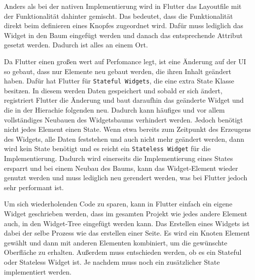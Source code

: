 
Anders als bei der nativen Implementierung wird in Flutter das Layoutfile mit der Funktionalität dahinter gemischt. Das bedeutet, dass die Funktionalität direkt beim definieren eines Knopfes zugeordnet wird. Dafür muss lediglich das Widget in den Baum eingefügt werden und danach das entsprechende Attribut gesetzt werden. Dadurch ist alles an einem Ort.

Da Flutter einen großen wert auf Perfomance legt, ist eine Änderung auf der \ac{UI} so gebaut, dass nur Elemente neu gebaut werden, die ihren Inhalt geändert haben. Dafür hat Flutter für \verb|Stateful Widgets|, die eine extra State Klasse besitzen. In diesem werden Daten gespeichert und sobald er sich ändert, registriert Flutter die Änderung und baut daraufhin das geänderte Widget und die in der Hierachie folgenden neu\cite{9623025}. Dadurch kann häufiges und vor allem vollständiges Neubauen des Widgetsbaums verhindert werden. Jedoch benötigt nicht jedes Element einen State. Wenn etwa bereits zum Zeitpunkt des Erzeugens des Widgets, alle Daten feststehen und auch nicht mehr geändert werden, dann wird kein State benötigt und es reicht ein \verb|Stateless Widget| für die Implementierung\cite[Kapitel~4]{Flutter_Recipes}. Dadurch wird einerseits die Implementierung eines States ersparrt und bei einem Neubau des Baums, kann das Widget-Element wieder genutzt werden und muss lediglich neu gerendert werden, was bei Flutter jedoch sehr performant ist.

Um sich wiederholenden Code zu sparen, kann in Flutter einfach ein eigene Widget geschrieben werden, dass im gesamten Projekt wie jedes andere Element auch, in den Widget-Tree eingefügt werden kann. Das Erstellen eines Widgets ist dabei der selbe Prozess wie das erstellen einer Seite. Es wird ein Knoten Element gewählt und dann mit anderen Elementen kombiniert, um die gewünschte Oberfläche zu erhalten. Außerdem muss entschieden werden, ob es ein Stateful oder Stateless Widget ist. Je nachdem muss noch ein zusätzlicher State implementiert werden.


